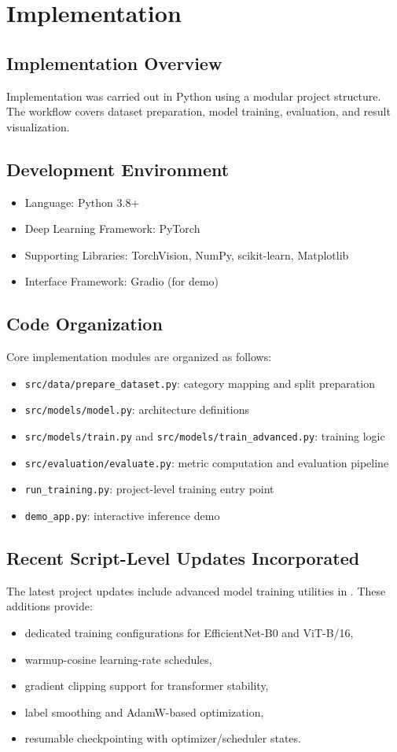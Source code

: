 \chapter{Implementation}

\section{Implementation Overview}
Implementation was carried out in Python using a modular project structure. The workflow covers dataset preparation, model training, evaluation, and result visualization.

\section{Development Environment}
\begin{itemize}
\item Language: Python 3.8+
\item Deep Learning Framework: PyTorch
\item Supporting Libraries: TorchVision, NumPy, scikit-learn, Matplotlib
\item Interface Framework: Gradio (for demo)
\end{itemize}

\section{Code Organization}
Core implementation modules are organized as follows:
\begin{itemize}
\item \texttt{src/data/prepare\_dataset.py}: category mapping and split preparation
\item \texttt{src/models/model.py}: architecture definitions
\item \texttt{src/models/train.py} and \texttt{src/models/train\_advanced.py}: training logic
\item \texttt{src/evaluation/evaluate.py}: metric computation and evaluation pipeline
\item \texttt{run\_training.py}: project-level training entry point
\item \texttt{demo\_app.py}: interactive inference demo
\end{itemize}

\section{Recent Script-Level Updates Incorporated}
The latest project updates include advanced model training utilities in . These additions provide:
\begin{itemize}
\item dedicated training configurations for EfficientNet-B0 and ViT-B/16,
\item warmup-cosine learning-rate schedules,
\item gradient clipping support for transformer stability,
\item label smoothing and AdamW-based optimization,
\item resumable checkpointing with optimizer/scheduler states.
\end{itemize}

